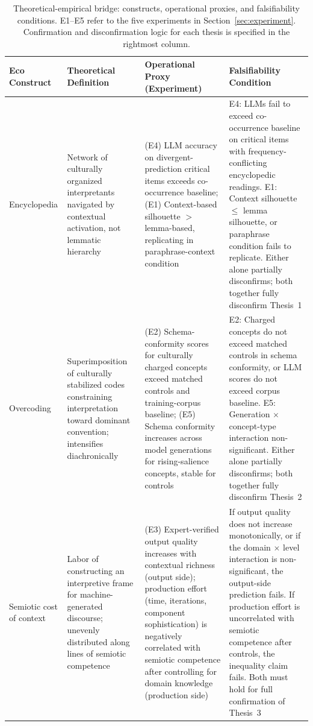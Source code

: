 \documentclass[12pt,a4paper]{article}
\begin{document}
\begin{table}[ht]
\centering
\small
\renewcommand{\arraystretch}{1.55}
\begin{tabularx}{\textwidth}{p{2.2cm}p{2.8cm}p{3.2cm}p{3.5cm}}
\toprule
\textbf{Eco Construct} & \textbf{Theoretical Definition} &
\textbf{Operational Proxy (Experiment)} &
\textbf{Falsifiability Condition} \\
\midrule
Encyclopedia &
Network of culturally organized interpretants navigated by contextual
activation, not lemmatic hierarchy &
(E4) LLM accuracy on divergent-prediction critical items exceeds co-occurrence
baseline; (E1) Context-based silhouette $>$ lemma-based, replicating in
paraphrase-context condition &
E4: LLMs fail to exceed co-occurrence baseline on critical items with frequency-conflicting
encyclopedic readings. E1: Context silhouette $\leq$ lemma silhouette, or
paraphrase condition fails to replicate. Either alone partially disconfirms;
both together fully disconfirm Thesis~1 \\
\addlinespace
Overcoding &
Superimposition of culturally stabilized codes constraining interpretation
toward dominant convention; intensifies diachronically &
(E2) Schema-conformity scores for culturally charged concepts exceed matched
controls and training-corpus baseline; (E5) Schema conformity increases
across model generations for rising-salience concepts, stable for controls &
E2: Charged concepts do not exceed matched controls in schema conformity, or
LLM scores do not exceed corpus baseline. E5: Generation $\times$
concept-type interaction non-significant. Either alone partially disconfirms;
both together fully disconfirm Thesis~2 \\
\addlinespace
Semiotic cost of context &
Labor of constructing an interpretive frame for machine-generated discourse;
unevenly distributed along lines of semiotic competence &
(E3) Expert-verified output quality increases with contextual richness (output
side); production effort (time, iterations, component sophistication) is
negatively correlated with semiotic competence after controlling for domain
knowledge (production side) &
If output quality does not increase monotonically, or if the domain
$\times$ level interaction is non-significant, the output-side prediction
fails. If production effort is uncorrelated with semiotic competence
after controls, the inequality claim fails. Both must hold for full
confirmation of Thesis~3 \\
\bottomrule
\end{tabularx}
\caption{Theoretical-empirical bridge: constructs, operational proxies,
and falsifiability conditions. E1--E5 refer to the five experiments in
Section~\ref{sec:experiment}. Confirmation and disconfirmation logic
for each thesis is specified in the rightmost column.}
\label{tab:bridge}
\end{table}
\end{document}
